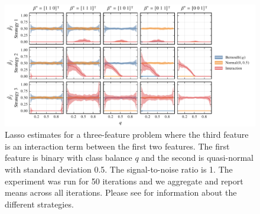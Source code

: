 \begin{figure}[htpb]
  \centering
  \includegraphics[]{plots/interactions-classbalance.pdf}
  \caption{%
    Lasso estimates for a three-feature problem where the third feature is an
    interaction term between the first two features. The first feature is
    binary with class balance \(q\) and the second is quasi-normal with
    standard deviation 0.5. The signal-to-noise ratio is 1. The experiment was
    run for 50 iterations and we aggregate and report means across all
    iterations. Please see  for information
    about the different strategies.
  }
  \label{fig:interactions-full}
\end{figure}
